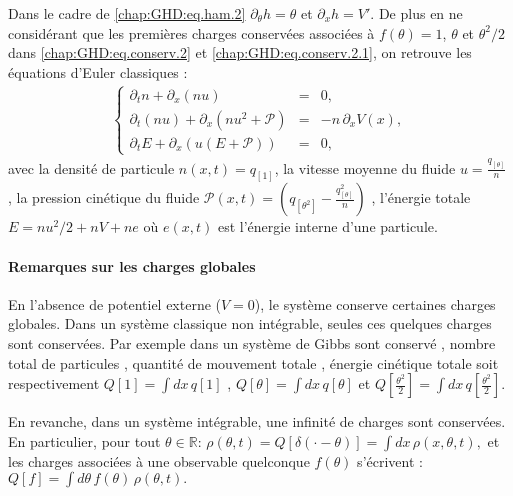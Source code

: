 Dans le cadre de \eqref{chap:GHD:eq.ham.2} \(\partial_\theta h = \theta\) et   \(\partial_x h  = V' \). De plus en ne considérant que les premières charges conservées associées à $f(\theta) = 1$, $\theta$ et $\theta^2/2$ dans \eqref{chap:GHD:eq.conserv.2} et \eqref{chap:GHD:eq.conserv.2.1}, on retrouve les équations d’Euler classiques :
\begin{eqnarray}\label{chap:3:eq:hydro.1}
	\left\{
	\begin{array}{rcl}
	\partial_t n + \partial_x (n u) &=& 0, \\
	\partial_t (n u) + \partial_x (n u^2 + \mathcal{P}) &=& -n \, \partial_x V(x), \\
	\partial_t E + \partial_x (u(E+\mathcal{P})) &=& 0,
	\end{array}
	\right .  
\end{eqnarray}
avec la densité de particule $n(x, t) = q_{[1]}$, la vitesse moyenne du fluide $u = \frac{q_{[\theta]}}{n}$ , la pression cinétique du fluide $\mathcal{P}(x, t) = \left( q_{[\theta^2]} - \frac{q_{[\theta]}^2}{n} \right)$ , l'énergie totale $E = nu^2/2 + nV + ne$ où $e(x,t)$ est l'énergie interne d'une particule.



\paragraph{Remarques sur les charges globales}
En l’absence de potentiel externe ($V = 0$), le système conserve certaines charges globales. Dans un système classique non intégrable, seules ces quelques charges sont conservées. Par exemple dans un système de Gibbs sont conservé , nombre total de particules , quantité de mouvement totale , énergie cinétique totale soit respectivement $Q[1]  =  \int dx \, q[1]$ , $Q[\theta] = \int dx \, q[\theta]$ et $Q\left[\frac{\theta^2}{2}\right] = \int dx \, q\left[\frac{\theta^2}{2}\right] $. 

\medskip

En revanche, dans un système intégrable, une infinité de charges sont conservées. En particulier, pour tout $\theta \in \mathbb{R}$:
\(
\rho(\theta , t ) = Q[\delta(\cdot - \theta)] = \int dx \, \rho(x, \theta, t),
\)
et les charges associées à une observable quelconque $f(\theta)$ s’écrivent :
\(
Q[f] = \int d\theta \, f(\theta) \, \rho(\theta, t).
\)

